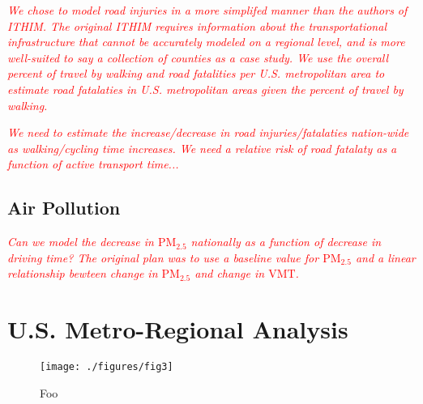 \documentclass{bioinfo}
\newcommand{\col}[2][red]{\textcolor{#1}{#2}}
\newcommand{\pEm}[1]{$\mathrm{PM}_{#1}$}
\newcommand{\vmt}{$\mathrm{VMT}$}
\begin{document}
\begin{methods}
\col[red]{\textit{
We chose to model road injuries in a more simplifed manner than the
authors of ITHIM.  The original ITHIM requires information about the
transportational infrastructure that cannot be accurately modeled on a
regional level, and is more well-suited to say a collection of
counties as a case study. \cite{maizlish2013}  We use the overall percent
of travel by walking and road fatalities per U.S. metropolitan area to
estimate road fatalaties in U.S. metropolitan areas given the percent
of travel by walking. \cite{UWTechReport}
}}

\col[red]{\textit{
We need to estimate the increase/decrease in road injuries/fatalaties
nation-wide as walking/cycling time increases.  We need a relative
risk of road fatalaty as a function of active transport time...
}}

\subsection{Air Pollution}

\col[red]{\textit{
    Can we model the decrease in \pEm{2.5} nationally as a function of
decrease in driving time?  The original plan was to use a baseline
value for \pEm{2.5} and a linear relationship bewteen change in
\pEm{2.5} and change in \vmt{}.
}}

\end{methods}

\section{U.S. Metro-Regional Analysis}

\begin{figure}[t]
    \centerline{\texttt{[image: ./figures/fig3]}}
    \caption{Foo}\label{meanMatrices}
\end{figure}
\end{document}
